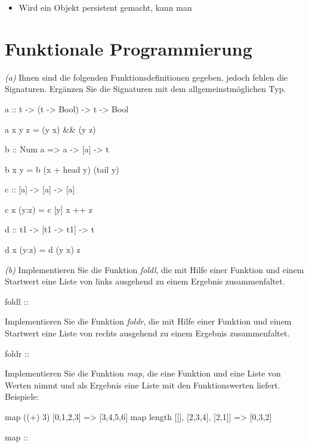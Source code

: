 \documentclass[11pt,a4paper,oneside,ngerman]{scrbook}
\begin{document}
\begin{itemize}[label={\Square \ \Square}]
  \item Wird ein Objekt persistent gemacht, kann man 
\end{itemize}


\newpage

\section{Funktionale Programmierung}


\emph{(a)} Ihnen sind die folgenden Funktionsdefinitionen gegeben, jedoch fehlen die Signaturen. Ergänzen Sie die Signaturen mit dem allgemeinstmöglichen Typ.
\begin{code}
  a :: t -> (t -> Bool) -> t -> Bool

  a x y z = (y x) && (y z)

  
  b :: Num a => a -> [a] -> t
  
  b x y = b (x + head y) (tail y)

  
  c :: [a] -> [a] -> [a]
  
  c x (y:z) = c [y] x ++ z

  
  d :: t1 -> [t1 -> t1] -> t

  d x (y:z) = d (y x) z
\end{code}



\emph{(b)} Implementieren Sie die Funktion \emph{foldl}, die mit Hilfe einer Funktion und einem Startwert eine Liste von links ausgehend zu einem Ergebnis zusammenfaltet.

\begin{code}
  foldl :: 


\end{code}

Implementieren Sie die Funktion \emph{foldr}, die mit Hilfe einer Funktion und einem Startwert eine Liste von rechts ausgehend zu einem Ergebnis zusammenfaltet.

\begin{code}
  foldr :: 


\end{code}

Implementieren Sie die Funktion \emph{map}, die eine Funktion und eine Liste von Werten nimmt und als Ergebnis eine Liste mit den Funktionswerten liefert. Beispiele:
\begin{code}
  map ((+) 3) [0,1,2,3]             => [3,4,5,6]
  map length [[], [2,3,4], [2,1]]   => [0,3,2]

  map :: 


\end{code}
\end{document}
